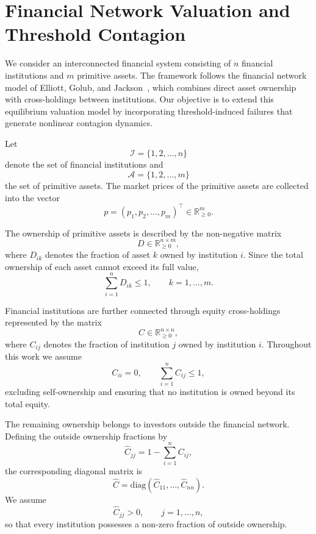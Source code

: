 \documentclass[aps,reprint,superscriptaddress,pra]{revtex4-2}
\begin{document}
\section{Financial Network Valuation and Threshold Contagion}

We consider an interconnected financial system consisting of $n$ financial institutions and $m$ primitive assets. The framework follows the financial network model of Elliott, Golub, and Jackson~\cite{elliott2014financial}, which combines direct asset ownership with cross-holdings between institutions. Our objective is to extend this equilibrium valuation model by incorporating threshold-induced failures that generate nonlinear contagion dynamics.

Let
\[
\mathcal I=\{1,2,\ldots,n\}
\]
denote the set of financial institutions and
\[
\mathcal A=\{1,2,\ldots,m\}
\]
the set of primitive assets. The market prices of the primitive assets are collected into the vector
\begin{equation}
p=(p_1,p_2,\ldots,p_m)^{\top}\in\mathbb{R}_{\ge0}^{m}.
\end{equation}

The ownership of primitive assets is described by the non-negative matrix
\begin{equation}
D\in\mathbb{R}_{\ge0}^{n\times m},
\end{equation}
where $D_{ik}$ denotes the fraction of asset $k$ owned by institution $i$. Since the total ownership of each asset cannot exceed its full value,
\begin{equation}
\sum_{i=1}^{n}D_{ik}\le1,
\qquad
k=1,\ldots,m.
\end{equation}

Financial institutions are further connected through equity cross-holdings represented by the matrix
\begin{equation}
C\in\mathbb{R}_{\ge0}^{n\times n},
\end{equation}
where $C_{ij}$ denotes the fraction of institution $j$ owned by institution $i$. Throughout this work we assume
\begin{equation}
C_{ii}=0,
\qquad
\sum_{i=1}^{n}C_{ij}\le1,
\end{equation}
excluding self-ownership and ensuring that no institution is owned beyond its total equity.

The remaining ownership belongs to investors outside the financial network. Defining the outside ownership fractions by
\begin{equation}
\hat C_{jj}
=
1-
\sum_{i=1}^{n}C_{ij},
\end{equation}
the corresponding diagonal matrix is
\begin{equation}
\hat C
=
\mathrm{diag}
(\hat C_{11},\ldots,\hat C_{nn}).
\end{equation}
We assume
\begin{equation}
\hat C_{jj}>0,
\qquad
j=1,\ldots,n,
\end{equation}
so that every institution possesses a non-zero fraction of outside ownership.
\end{document}
